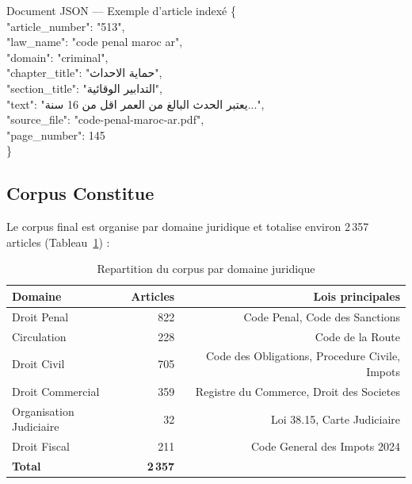 \begin{jsonblock}{Document JSON --- Exemple d'article indexé}
\{\\
\quad "article\_number": "513",\\
\quad "law\_name": "code penal maroc ar",\\
\quad "domain": "criminal",\\
\quad "chapter\_title": "\textarabic{حماية الاحداث}",\\
\quad "section\_title": "\textarabic{التدابير الوقائية}",\\
\quad "text": "\textarabic{يعتبر الحدث البالغ من العمر اقل من 16 سنة...}",\\
\quad "source\_file": "code-penal-maroc-ar.pdf",\\
\quad "page\_number": 145\\
\}
\end{jsonblock}
\label{lst:article-json}
\subsection{Corpus Constitue}

Le corpus final est organise par domaine juridique et totalise environ 2\,357 articles (Tableau~\ref{tab:corpus-domaines}) :

\begin{table}[h]
\centering
\renewcommand{\arraystretch}{1.3}
\begin{tabular}{|l|r|r|}
\hline
\rowcolor{LightBlue}
\textbf{\color{PrimaryBlue}Domaine} & \textbf{\color{PrimaryBlue}Articles} & \textbf{\color{PrimaryBlue}Lois principales} \\
\hline
Droit Penal & 822 & Code Penal, Code des Sanctions \\
Circulation & 228 & Code de la Route \\
Droit Civil & 705 & Code des Obligations, Procedure Civile, Impots \\
Droit Commercial & 359 & Registre du Commerce, Droit des Societes \\
Organisation Judiciaire & 32 & Loi 38.15, Carte Judiciaire \\
Droit Fiscal & 211 & Code General des Impots 2024 \\
\hline
\textbf{Total} & \textbf{2\,357} & \\
\hline
\end{tabular}
\caption{Repartition du corpus par domaine juridique}
\label{tab:corpus-domaines}
\end{table}

